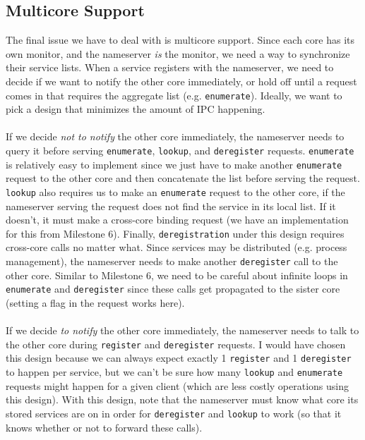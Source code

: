 \subsection{Multicore Support}
The final issue we have to deal with is multicore support. Since each core has its own monitor, and the nameserver \textit{is} the monitor, we need a way to synchronize their service lists. When a service registers with the nameserver, we need to decide if we want to notify the other core immediately, or hold off until a request comes in that requires the aggregate list (e.g. \texttt{enumerate}). Ideally, we want to pick a design that minimizes the amount of IPC happening.
\\\\
If we decide \textit{not to notify} the other core immediately, the nameserver needs to query it before serving \texttt{enumerate}, \texttt{lookup}, and \texttt{deregister} requests. \texttt{enumerate} is relatively easy to implement since we just have to make another \texttt{enumerate} request to the other core and then concatenate the list before serving the request. \texttt{lookup} also requires us to make an \texttt{enumerate} request to the other core, if the nameserver serving the request does not find the service in its local list. If it doesn't, it must make a cross-core binding request (we have an implementation for this from Milestone 6). Finally, \texttt{deregistration} under this design requires cross-core calls no matter what. Since services may be distributed (e.g. process management), the nameserver needs to make another \texttt{deregister} call to the other core. Similar to Milestone 6, we need to be careful about infinite loops in \texttt{enumerate} and \texttt{deregister} since these calls get propagated to the sister core (setting a flag in the request works here).
\\\\
If we decide \textit{to notify} the other core immediately, the nameserver needs to talk to the other core during \texttt{register} and \texttt{deregister} requests. I would have chosen this design because we can always expect exactly 1 \texttt{register} and 1 \texttt{deregister} to happen per service, but we can't be sure how many \texttt{lookup} and \texttt{enumerate} requests might happen for a given client (which are less costly operations using this design). With this design, note that the nameserver must know what core its stored services are on in order for \texttt{deregister} and \texttt{lookup} to work (so that it knows whether or not to forward these calls).
